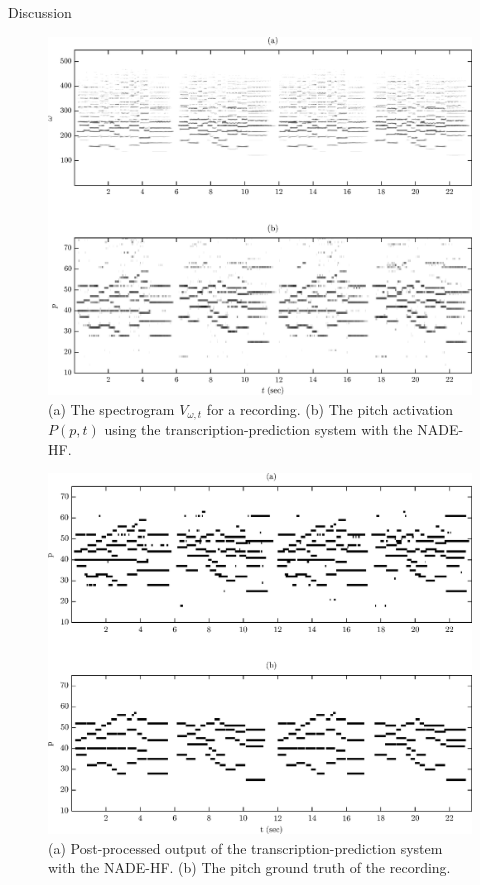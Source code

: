 \documentclass[final]{beamer}
\newlength{\onecolwid}
\begin{document}
\begin{frame}[t]
\begin{columns}[t]
\begin{column}{\onecolwid}
\begin{block}{Discussion}
\begin{figure}
\includegraphics[width=0.9\linewidth]{FigSpectrogram.eps}
\caption{(a) The spectrogram $V_{\omega,t}$ for a recording. (b) The pitch activation $P(p,t)$ using the  transcription-prediction system with the NADE-HF.}
\end{figure}

\begin{figure}
\includegraphics[width=0.9\linewidth]{FigTranscription.eps}
\caption{(a) Post-processed output of the transcription-prediction system with the NADE-HF. (b) The pitch ground truth of the recording.}
\end{figure}


\end{block}
\end{column}
\end{columns}
\end{frame}
\end{document}
